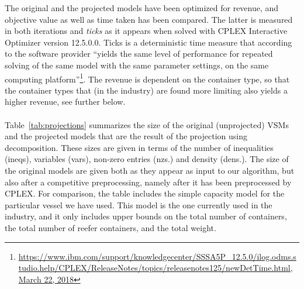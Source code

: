 The original and the projected models have been optimized for revenue, and objective value as well as time taken has been compared. The latter is measured in both iterations and \emph{ticks} as it appears when solved with CPLEX Interactive Optimizer version 12.5.0.0. Ticks is a deterministic time measure that according to the software provider ``yields the same level of performance for repeated solving of the same model with the same parameter settings, on the same computing platform''\footnote{\url{https://www.ibm.com/support/knowledgecenter/SSSA5P_12.5.0/ilog.odms.studio.help/CPLEX/ReleaseNotes/topics/releasenotes125/newDetTime.html, March 22, 2018}}. 
The revenue is dependent on the container type, so that the container types that (in the industry) are found more limiting also yields a higher revenue, see further below. 
\\\\
Table~\ref{tab:projections} summarizes the size of the original (unprojected) VSMs and the projected models that are the result of the projection using decomposition. These sizes are given in terms of the number of inequalities (ineqs), variables (vars), non-zero entries (nzs.) and density (dens.). The size of the original models are given both as they appear as input to our algorithm, but also after a {competitive} preprocessing, namely after it has been preprocessed by CPLEX. For comparison, the table includes the simple capacity model for the particular vessel we have used. This model is the one currently used in the industry, and it only includes upper bounds on the total number of containers, the total number of reefer containers, and the total weight.  

